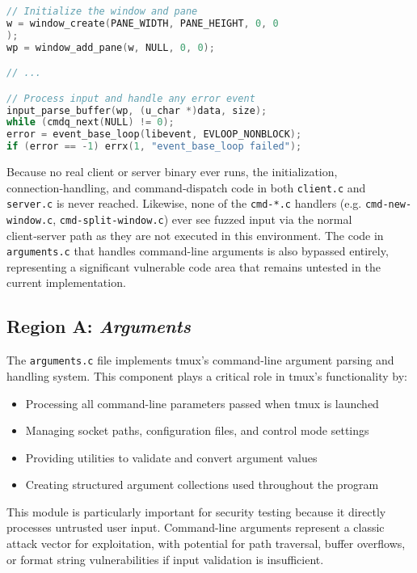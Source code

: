 \documentclass[11pt,a4paper,twocolumn]{article}
\begin{document}
\begin{lstlisting}[language=C,caption={Core of the `input-fuzzer` fuzzer code, including in-memory window and pane creation},label={lst:input-fuzzer}]
// Initialize the window and pane
w = window_create(PANE_WIDTH, PANE_HEIGHT, 0, 0
);
wp = window_add_pane(w, NULL, 0, 0);

// ...

// Process input and handle any error event
input_parse_buffer(wp, (u_char *)data, size);
while (cmdq_next(NULL) != 0);
error = event_base_loop(libevent, EVLOOP_NONBLOCK);
if (error == -1) errx(1, "event_base_loop failed");
\end{lstlisting}

Because no real client or server binary ever runs, the initialization, connection‑handling, and command‑dispatch code in both \texttt{client.c} and \texttt{server.c} is never reached. Likewise, none of the \texttt{cmd-*.c} handlers (e.g. \texttt{cmd-new-window.c}, \texttt{cmd-split-window.c}) ever see fuzzed input via the normal client‑server path as they are not executed in this environment. The code in \texttt{arguments.c} that handles command-line arguments is also bypassed entirely, representing a significant vulnerable code area that remains untested in the current implementation.


\subsection*{Region A: \textit{Arguments}}

The \texttt{arguments.c} file implements tmux's command-line argument parsing and handling system. This component plays a critical role in tmux's functionality by:

\begin{itemize}
  \item Processing all command-line parameters passed when tmux is launched
  \item Managing socket paths, configuration files, and control mode settings
  \item Providing utilities to validate and convert argument values
  \item Creating structured argument collections used throughout the program
\end{itemize}

This module is particularly important for security testing because it directly processes untrusted user input. Command-line arguments represent a classic attack vector for exploitation, with potential for path traversal, buffer overflows, or format string vulnerabilities if input validation is insufficient.
\end{document}
